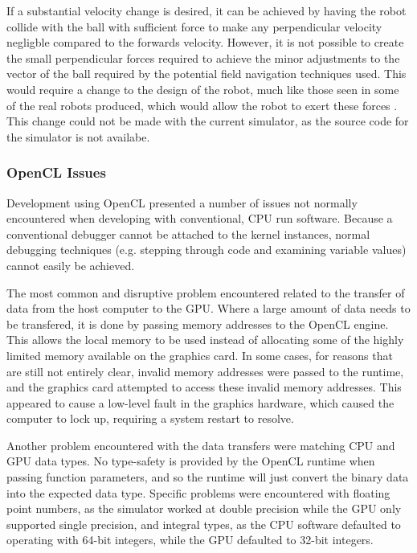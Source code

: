 \documentclass[10pt]{article}
\begin{document}
If a substantial velocity change is desired, it can be achieved by having the
robot collide with the ball with sufficient force to make any perpendicular
velocity negligble compared to the forwards velocity.  However, it is not
possible to create the small perpendicular forces required to achieve the minor
adjustments to the vector of the ball required by the potential field navigation
techniques used. This would require a change to the design of the robot, much
like those seen in some of the real robots produced, which would allow the robot
to exert these forces \cite{aSuitablePaper}.  This change could not be made with
the current simulator, as the source code for the simulator is not availabe.

\subsubsection{OpenCL Issues}

Development using OpenCL presented a number of issues not normally encountered
when developing with conventional, \ac{CPU} run software.  Because a
conventional debugger cannot be attached to the kernel instances, normal
debugging techniques (e.g. stepping through code and examining variable values)
cannot easily be achieved.

The most common and disruptive problem encountered related to the transfer of
data from the host computer to the \ac{GPU}.  Where a large amount of data needs
to be transfered, it is done by passing memory addresses to the OpenCL engine. 
This allows the local memory to be used instead of allocating some of the highly
limited memory available on the graphics card.  In some cases, for reasons that
are still not entirely clear, invalid memory addresses were passed to the
runtime, and the graphics card attempted to access these invalid memory
addresses.  This appeared to cause a low-level fault in the graphics hardware,
which caused the computer to lock up, requiring a system restart to resolve.

Another problem encountered with the data transfers were matching \ac{CPU} and
\ac{GPU} data types.  No type-safety is provided by the OpenCL runtime when
passing function parameters, and so the runtime will just convert the binary
data into the expected data type.  Specific problems were encountered with
floating point numbers, as the simulator worked at double precision while the
\ac{GPU} only supported single precision, and integral types, as the \ac{CPU}
software defaulted to operating with 64-bit integers, while the \ac{GPU}
defaulted to 32-bit integers.
\end{document}
